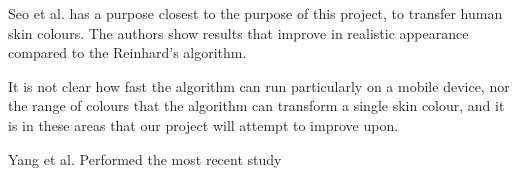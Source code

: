 Seo et al. \cite{seo_2005_transfer} has a purpose closest to the purpose of this project, to transfer human skin colours. The authors show results that improve in realistic appearance compared to the Reinhard's algorithm.


It is not clear how fast the algorithm can run particularly on a mobile device, nor the range of colours that the algorithm can transform a single skin colour, and it is in these areas that our project will attempt to improve upon.

Yang et al. Performed the most recent study 






